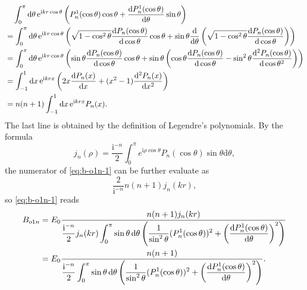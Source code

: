 \documentclass[hyperref, a4paper]{article}
\newcommand*{\ii}{\mathrm{i}}
\newcommand*{\ee}{\mathrm{e}}
\begin{document}
\[
    \begin{aligned}
        &\quad \int_0^\pi \dd{\theta} \ee^{\ii k r \cos \theta} \left( P^1_n(\cos\theta) \cos\theta + \dv{P^1_n(\cos\theta)}{\theta} \sin \theta \right) \\
        &= \int_0^\pi \dd{\theta} \ee^{\ii k r \cos \theta} \left( \sqrt{1 - \cos^2\theta} \dv{P_n(\cos\theta)}{\cos \theta } \cos\theta + \sin \theta \dv{\theta} \left( \sqrt{1 - \cos^2\theta} \dv{P_n(\cos\theta)}{\cos \theta }  \right) \right) \\
        &= \int_0^\pi \dd{\theta} \ee^{\ii k r \cos \theta} \left( \sin\theta \dv{P_n(\cos\theta)}{\cos \theta } \cos\theta + \sin \theta \left( \cos\theta \dv{P_n(\cos\theta)}{\cos\theta} - \sin^2\theta \dv[2]{P_n(\cos\theta)}{\cos\theta} \right) \right) \\
        &= \int_{-1}^1 \dd{x} \ee^{\ii k r x} \left( 2 x \dv{P_n(x)}{x} + (x^2 - 1) \dv[2]{P_n(x)}{x} \right) \\
        &= n(n+1) \int_{-1}^1 \dd{x} \ee^{\ii k r x} P_n(x).
    \end{aligned}
\] 
The last line is obtained by the definition of Legendre's polynomials.
By the formula 
\begin{equation}
    j_{n}(\rho)=\frac{\mathrm{i}^{-n}}{2} \int_{0}^{\pi} e^{\mathrm{i} \rho \cos \theta} P_{n}(\cos \theta) \sin \theta \mathrm{d} \theta ,
\end{equation}
the numerator of \eqref{eq:b-o1n-1} can be further evaluate as 
\[
    \frac{2}{\ii^{-n}} n(n+1) j_n(kr),
\]
so \eqref{eq:b-o1n-1} reads
\begin{equation}
    \begin{aligned}
        B_{o1n} &= E_0 \frac{n(n+1) j_n(kr)}{\displaystyle \frac{\ii^{-n}}{2} j_n(kr) \int_0^\pi \sin \theta \dd{\theta} \left( \frac{1}{\sin^2 \theta} (P^1_n(\cos \theta))^2 + \left( \dv{P_n^1(\cos\theta)}{\theta} \right)^2 \right) } \\
        &= E_0 \frac{n(n+1)}{\displaystyle \frac{\ii^{-n}}{2}  \int_0^\pi \sin \theta \dd{\theta} \left( \frac{1}{\sin^2 \theta} (P^1_n(\cos \theta))^2 + \left( \dv{P_n^1(\cos\theta)}{\theta} \right)^2 \right) }.
    \end{aligned}
\end{equation}
\end{document}

